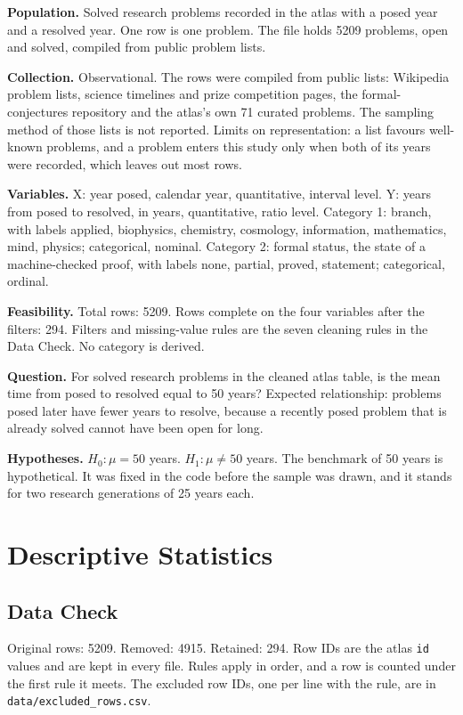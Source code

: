\documentclass[11pt]{article}
\begin{document}
\textbf{Population.} Solved research problems recorded in the atlas with a posed year and a resolved year. One row is one problem. The file holds 5209 problems, open and solved, compiled from public problem lists.

\textbf{Collection.} Observational. The rows were compiled from public lists: Wikipedia problem lists, science timelines and prize competition pages, the formal-conjectures repository and the atlas's own 71 curated problems. The sampling method of those lists is not reported. Limits on representation: a list favours well-known problems, and a problem enters this study only when both of its years were recorded, which leaves out most rows.

\textbf{Variables.} X: year posed, calendar year, quantitative, interval level. Y: years from posed to resolved, in years, quantitative, ratio level. Category 1: branch, with labels applied, biophysics, chemistry, cosmology, information, mathematics, mind, physics; categorical, nominal. Category 2: formal status, the state of a machine-checked proof, with labels none, partial, proved, statement; categorical, ordinal.

\textbf{Feasibility.} Total rows: 5209. Rows complete on the four variables after the filters: 294. Filters and missing-value rules are the seven cleaning rules in the Data Check. No category is derived.

\textbf{Question.} For solved research problems in the cleaned atlas table, is the mean time from posed to resolved equal to 50 years? Expected relationship: problems posed later have fewer years to resolve, because a recently posed problem that is already solved cannot have been open for long.

\textbf{Hypotheses.} $H_0: \mu = 50$ years. $H_1: \mu \ne 50$ years. The benchmark of 50 years is hypothetical. It was fixed in the code before the sample was drawn, and it stands for two research generations of 25 years each.

\section{Descriptive Statistics}

\subsection{Data Check}

Original rows: 5209. Removed: 4915. Retained: 294. Row IDs are the atlas \texttt{id} values and are kept in every file. Rules apply in order, and a row is counted under the first rule it meets. The excluded row IDs, one per line with the rule, are in \texttt{data/excluded\_rows.csv}.
\end{document}
